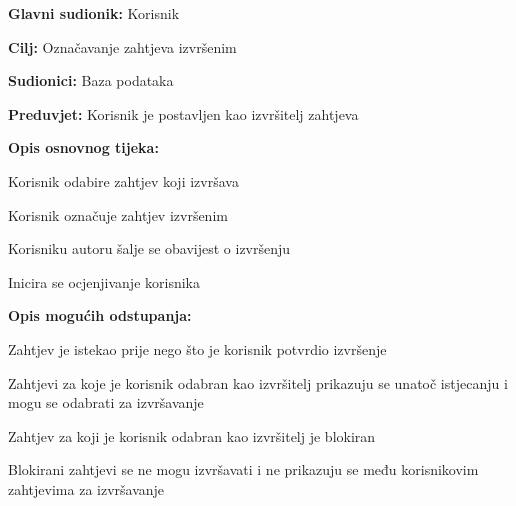 					\noindent {}
					\begin{packed_item}
						
						\item \textbf{Glavni sudionik: }Korisnik
						\item  \textbf{Cilj:} Označavanje zahtjeva izvršenim 
						\item  \textbf{Sudionici:} Baza podataka
						\item  \textbf{Preduvjet:} Korisnik je postavljen kao izvršitelj zahtjeva
						\item  \textbf{Opis osnovnog tijeka:}
						
						\item[] \begin{packed_enum}
							
							\item Korisnik odabire zahtjev koji izvršava
							\item Korisnik označuje zahtjev izvršenim
							\item Korisniku autoru šalje se obavijest o izvršenju
							\item Inicira se ocjenjivanje korisnika
							
						\end{packed_enum}
					
						
						
						
						
						
						
						
						\item  \textbf{Opis mogućih odstupanja:}
							
							\item[] \begin{packed_item}
															
							\item[1.a] Zahtjev je istekao prije nego što je korisnik potvrdio izvršenje
							\item[] \begin{packed_enum}
								
								\item Zahtjevi za koje je korisnik odabran kao izvršitelj prikazuju se unatoč istjecanju i mogu se odabrati za izvršavanje
								
							\end{packed_enum}
							\item[1.b] Zahtjev za koji je korisnik odabran kao izvršitelj je blokiran
							\item[] \begin{packed_enum}
								
								\item Blokirani zahtjevi se ne mogu izvršavati i ne prikazuju se među korisnikovim zahtjevima za izvršavanje
								
									\end{packed_enum}
							

						\end{packed_item}
				\end{packed_item}
				
